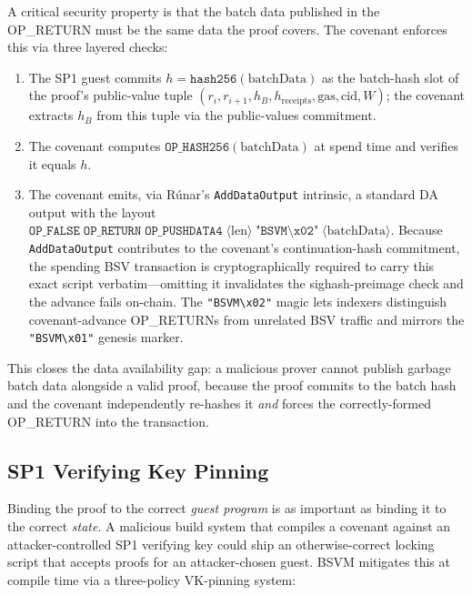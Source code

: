 \documentclass[11pt,twocolumn]{article}
\begin{document}
A critical security property is that the batch data published in the OP\_RETURN must be the same data the proof covers. The covenant enforces this via three layered checks:

\begin{enumerate}[nosep,leftmargin=1.5em]
\item The SP1 guest commits $h = \texttt{hash256}(\text{batchData})$ as the batch-hash slot of the proof's public-value tuple $(r_i, r_{i+1}, h_B, h_{\text{receipts}}, \text{gas}, \text{cid}, W)$; the covenant extracts $h_B$ from this tuple via the public-values commitment.
\item The covenant computes $\texttt{OP\_HASH256}(\text{batchData})$ at spend time and verifies it equals $h$.
\item The covenant emits, via R\'{u}nar's \texttt{AddDataOutput} intrinsic, a standard DA output with the layout $\texttt{OP\_FALSE}\;\texttt{OP\_RETURN}\;\texttt{OP\_PUSHDATA4}\;\langle \text{len} \rangle\;\texttt{"BSVM\textbackslash x02"}\;\langle \text{batchData} \rangle$. Because \texttt{AddDataOutput} contributes to the covenant's continuation-hash commitment, the spending BSV transaction is cryptographically required to carry this exact script verbatim---omitting it invalidates the sighash-preimage check and the advance fails on-chain. The \texttt{"BSVM\textbackslash x02"} magic lets indexers distinguish covenant-advance OP\_RETURNs from unrelated BSV traffic and mirrors the \texttt{"BSVM\textbackslash x01"} genesis marker.
\end{enumerate}

This closes the data availability gap: a malicious prover cannot publish garbage batch data alongside a valid proof, because the proof commits to the batch hash and the covenant independently re-hashes it \emph{and} forces the correctly-formed OP\_RETURN into the transaction.

\subsection{SP1 Verifying Key Pinning}
\label{sec:vk-pinning}

Binding the proof to the correct \emph{guest program} is as important as binding it to the correct \emph{state}. A malicious build system that compiles a covenant against an attacker-controlled SP1 verifying key could ship an otherwise-correct locking script that accepts proofs for an attacker-chosen guest. BSVM mitigates this at compile time via a three-policy VK-pinning system:
\end{document}
